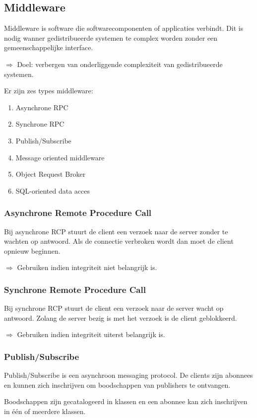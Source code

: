 \documentclass[a4paper,12pt]{article}
\begin{document}
\subsection{Middleware}
Middleware is software die softwarecomponenten of applicaties verbindt.
Dit is nodig wanner gedistribueerde systemen te complex worden zonder een gemeenschappelijke interface.

$\Rightarrow$ Doel: verbergen van onderliggende complexiteit van gedistribueerde systemen.

Er zijn zes types middleware:
\begin{enumerate}
\item Asynchrone RPC
\item Synchrone RPC
\item Publish/Subscribe
\item Message oriented middleware
\item Object Request Broker
\item SQL-oriented data acces
\end{enumerate}

\subsubsection{Asynchrone Remote Procedure Call}
Bij asynchrone RCP stuurt de client een verzoek naar de server zonder te wachten op antwoord.
Als de connectie verbroken wordt dan moet de client opnieuw beginnen.

$\Rightarrow$ Gebruiken indien integriteit niet belangrijk is.

\subsubsection{Synchrone Remote Procedure Call}
Bij synchrone RCP stuurt de client een verzoek naar de server wacht op antwoord.
Zolang de server bezig is met het verzoek is de client geblokkeerd.

$\Rightarrow$ Gebruiken indien integriteit uiterst belangrijk is.

\subsubsection{Publish/Subscribe}
Publish/Subscribe is een asynchroon messaging protocol.
De clients zijn abonnees en kunnen zich inschrijven om boodschappen van publishers te ontvangen.

Boodschappen zijn gecatalogeerd in klassen en een abonnee kan zich inschrijven in één of meerdere klassen.
\end{document}
